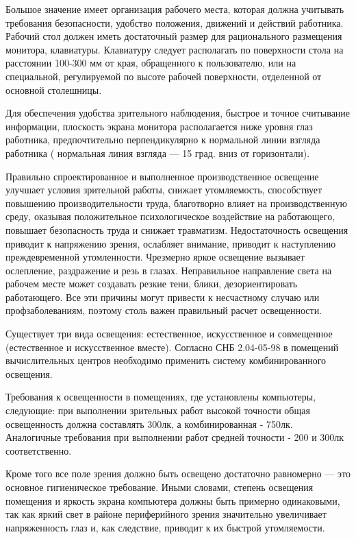 \documentclass[14pt,a4paper]{reportmod}
\begin{document}
Большое значение имеет организация рабочего места, которая должна учитывать требования безопасности, удобство положения, движений и действий работника. Рабочий стол должен иметь достаточный размер для рационального размещения монитора, клавиатуры. Клавиатуру следует располагать по поверхности стола на расстоянии 100-300 мм от края, обращенного к пользователю, или на специальной, регулируемой по высоте рабочей поверхности, отделенной от основной столешницы.


Для обеспечения удобства зрительного наблюдения, быстрое и точное считывание информации, плоскость экрана монитора располагается ниже уровня глаз работника, предпочтительно перпендикулярно к нормальной линии взгляда работника ( нормальная линия взгляда — 15 град. вниз от горизонтали).


Правильно спроектированное и выполненное производственное освещение улучшает условия зрительной работы, снижает утомляемость, способствует повышению производительности труда, благотворно влияет на производственную среду, оказывая положительное психологическое воздействие на работающего, повышает безопасность труда и снижает травматизм. Недостаточность освещения приводит к напряжению зрения, ослабляет внимание, приводит к наступлению преждевременной утомленности. Чрезмерно яркое освещение вызывает ослепление, раздражение и резь в глазах. Неправильное направление света на рабочем месте может создавать резкие тени, блики, дезориентировать работающего. Все эти причины могут привести к несчастному случаю или профзаболеваниям, поэтому столь важен правильный расчет освещенности.


Существует три вида освещения: естественное, искусственное и совмещенное (естественное и искусственное вместе). Согласно СНБ 2.04-05-98 в помещений вычислительных центров необходимо применить систему комбинированного освещения.


Требования к освещенности в помещениях, где установлены компьютеры, следующие: при выполнении зрительных работ высокой точности общая освещенность должна составлять 300лк, а комбинированная - 750лк. Аналогичные требования при выполнении работ средней точности - 200 и 300лк соответственно.


Кроме того все поле зрения должно быть освещено достаточно равномерно --- это основное гигиеническое требование. Иными словами, степень освещения помещения и яркость экрана компьютера должны быть примерно одинаковыми, так как яркий свет в районе периферийного зрения значительно увеличивает напряженность глаз и, как следствие, приводит к их быстрой утомляемости.
\end{document}
